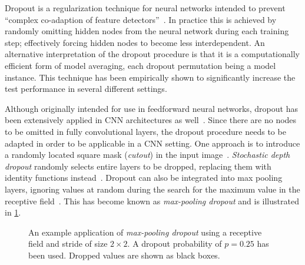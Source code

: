 Dropout is a regularization technique for neural networks intended to prevent \enquote{complex co-adaption of feature detectors}~\cite{dropout-original-paper}.
In practice this is achieved by randomly omitting hidden nodes from the neural network during each training step; effectively forcing hidden nodes to become less interdependent.
An alternative interpretation of the dropout procedure is that it is a computationally efficient form of model averaging, each dropout permutation being a model instance.
This technique has been empirically shown to significantly increase the test performance in several different settings.

Although originally intended for use in feedforward neural networks, dropout has been extensively applied in CNN architectures as well~\cite{dropout-cnn}.
Since there are no nodes to be omitted in fully convolutional layers, the dropout procedure needs to be adapted in order to be applicable in a CNN setting.
One approach is to introduce a randomly located square mask (\textit{cutout}) in the input image~\cite{dropout-cutout}.
\textit{Stochastic depth dropout} randomly selects entire layers to be dropped, replacing them with identity functions instead~\cite{dropout-stochastic-depth}.
Dropout can also be integrated into max pooling layers, ignoring values at random during the search for the maximum value in the receptive field~\cite{max-pooling-dropout}.
This has become known as \textit{max-pooling dropout} and is illustrated in \cref{fig:max-pooling-dropout}.

\begin{figure}[H]
  
  \caption{%
    An example application of \textit{max-pooling dropout} using a receptive field and stride of size $2 \times 2$.
    A dropout probability of $p = 0.25$ has been used.
    Dropped values are shown as black boxes.
  }%
  \label{fig:max-pooling-dropout}
\end{figure}
